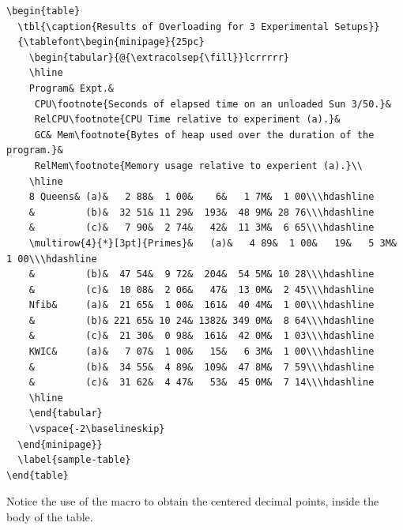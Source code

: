 \documentclass{CUP-JNL-NLP}
\begin{document}
{\fontsize{7}{9}\selectfont
\begin{verbatim}
\begin{table}
  \tbl{\caption{Results of Overloading for 3 Experimental Setups}}
  {\tablefont\begin{minipage}{25pc}
    \begin{tabular}{@{\extracolsep{\fill}}lcrrrrr}
    \hline
    Program& Expt.&
     CPU\footnote{Seconds of elapsed time on an unloaded Sun 3/50.}&
     RelCPU\footnote{CPU Time relative to experiment (a).}&
     GC& Mem\footnote{Bytes of heap used over the duration of the program.}&
     RelMem\footnote{Memory usage relative to experient (a).}\\
    \hline
    8 Queens& (a)&   2 88&  1 00&    6&   1 7M&  1 00\\\hdashline
    &         (b)&  32 51& 11 29&  193&  48 9M& 28 76\\\hdashline
    &         (c)&   7 90&  2 74&   42&  11 3M&  6 65\\\hdashline
    \multirow{4}{*}[3pt]{Primes}&   (a)&   4 89&  1 00&   19&   5 3M&  1 00\\\hdashline
    &         (b)&  47 54&  9 72&  204&  54 5M& 10 28\\\hdashline
    &         (c)&  10 08&  2 06&   47&  13 0M&  2 45\\\hdashline
    Nfib&     (a)&  21 65&  1 00&  161&  40 4M&  1 00\\\hdashline
    &         (b)& 221 65& 10 24& 1382& 349 0M&  8 64\\\hdashline
    &         (c)&  21 30&  0 98&  161&  42 0M&  1 03\\\hdashline
    KWIC&     (a)&   7 07&  1 00&   15&   6 3M&  1 00\\\hdashline
    &         (b)&  34 55&  4 89&  109&  47 8M&  7 59\\\hdashline
    &         (c)&  31 62&  4 47&   53&  45 0M&  7 14\\\hdashline
    \hline
    \end{tabular}
    \vspace{-2\baselineskip}
  \end{minipage}}
  \label{sample-table}
\end{table}
\end{verbatim}}
%
\noindent Notice the use of the \verb"" macro to obtain the centered
decimal points, inside the body of the table.
\end{document}
